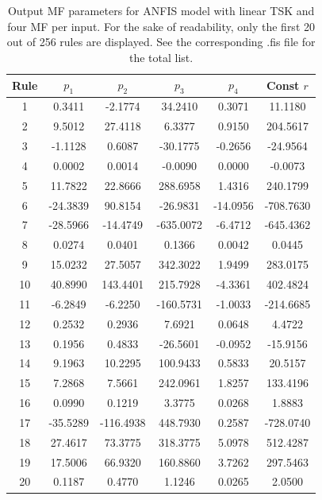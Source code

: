 \documentclass[12pt]{article}
\begin{document}
\begin{table}[H]
\centering
\begin{tabular}{|c|c|c|c|c|c|}
\hline
\textbf{Rule} & \textbf{$p_1$} & \textbf{$p_2$} & \textbf{$p_3$} & \textbf{$p_4$} & \textbf{Const $r$} \\ \hline
1 & 0.3411 & -2.1774 & 34.2410 & 0.3071 & 11.1180 \\ \hline
2 & 9.5012 & 27.4118 & 6.3377 & 0.9150 & 204.5617 \\ \hline
3 & -1.1128 & 0.6087 & -30.1775 & -0.2656 & -24.9564 \\ \hline
4 & 0.0002 & 0.0014 & -0.0090 & 0.0000 & -0.0073 \\ \hline
5 & 11.7822 & 22.8666 & 288.6958 & 1.4316 & 240.1799 \\ \hline
6 & -24.3839 & 90.8154 & -26.9831 & -14.0956 & -708.7630 \\ \hline
7 & -28.5966 & -14.4749 & -635.0072 & -6.4712 & -645.4362 \\ \hline
8 & 0.0274 & 0.0401 & 0.1366 & 0.0042 & 0.0445 \\ \hline
9 & 15.0232 & 27.5057 & 342.3022 & 1.9499 & 283.0175 \\ \hline
10 & 40.8990 & 143.4401 & 215.7928 & -4.3361 & 402.4824 \\ \hline
11 & -6.2849 & -6.2250 & -160.5731 & -1.0033 & -214.6685 \\ \hline
12 & 0.2532 & 0.2936 & 7.6921 & 0.0648 & 4.4722 \\ \hline
13 & 0.1956 & 0.4833 & -26.5601 & -0.0952 & -15.9156 \\ \hline
14 & 9.1963 & 10.2295 & 100.9433 & 0.5833 & 20.5157 \\ \hline
15 & 7.2868 & 7.5661 & 242.0961 & 1.8257 & 133.4196 \\ \hline
16 & 0.0990 & 0.1219 & 3.3775 & 0.0268 & 1.8883 \\ \hline
17 & -35.5289 & -116.4938 & 448.7930 & 0.2587 & -728.0740 \\ \hline
18 & 27.4617 & 73.3775 & 318.3775 & 5.0978 & 512.4287 \\ \hline
19 & 17.5006 & 66.9320 & 160.8860 & 3.7262 & 297.5463 \\ \hline
20 & 0.1187 & 0.4770 & 1.1246 & 0.0265 & 2.0500 \\ \hline
\end{tabular}
\caption{Output MF parameters for ANFIS model with linear TSK and four MF per input. 
For the sake of readability, only the first 20 out of 256 rules are displayed. 
See the corresponding .fis file for the total list. }
\end{table}
\end{document}
